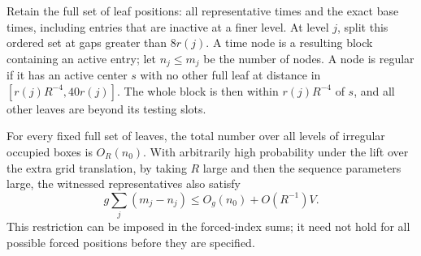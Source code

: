 Retain the full set of leaf positions: all representative times and
the exact base times, including entries that are inactive at a finer
level.  At level $j$, split this ordered set at gaps greater than
$8r(j)$.  A time node is a resulting block containing an active
entry; let $n_j\le m_j$ be the number of nodes.  A node is regular
if it has an active center $s$ with no other full leaf at distance
in $[r(j)R^{-4},40r(j)]$.  The whole block is then within
$r(j)R^{-4}$ of $s$, and all other leaves are beyond its testing
slots.

\begin{lemma}\label{addr:regularization}
For every fixed full set of leaves, the total number over all levels
of irregular occupied boxes is $O_R(n_0)$.  With arbitrarily high
probability under the lift over the extra grid translation, by taking
$R$ large and then the sequence parameters large, the witnessed
representatives also satisfy
\begin{equation}\label{eq:original-22}
 g\sum_j(m_j-n_j)\le O_g(n_0)+O(R^{-1})V.
\end{equation}
This restriction can be imposed in the forced-index sums; it need
not hold for all possible forced positions before they are specified.
\end{lemma}

